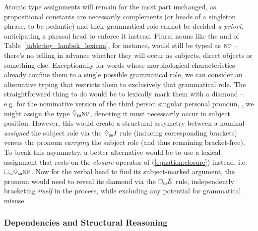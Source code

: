 Atomic type assignments will remain for the most part unchanged, as propositional constants are necessarily complements (or heads of a singleton phrase, to be pedantic) and their grammatical role cannot be decided \textit{a priori}, anticipating a phrasal head to enforce it instead.
Plural nouns like the  and  of Table~\ref{table:toy_lambek_lexicon}, for instance, would still be typed as $\np[s]$ -- there's no telling in advance whether they will occur as subjects, direct objects or something else.
Exceptionally for words whose morphological characteristics already confine them to a single possible grammatical role, we can consider an alternative typing that restricts them to exclusively that grammatical role.
The straightforward thing to do would be to lexically mark them with a diamond -- e.g. for the nominative version of the third person singular personal pronoun, , we might assign the type $\ddia{su}\np[s]$, denoting it must necessarily occur in subject position.
However, this would create a structural assymetry between a nominal \textit{assigned} the subject role via the $\ddia{su} I$ rule (inducing corresponding brackets) versus the pronoun \textit{carrying} the subject role (and thus remaining bracket-free).
To break this asymmetry, a better alternative would be to use a lexical assignment that rests on the \textit{closure} operator of (\ref{equation:closure}) instead, i.e. $\dbox{su}\ddia{su}\np[s]$.
Now for the verbal head to find its subject-marked argument, the pronoun would need to reveal its diamond via the $\dbox{su} E$ rule, independently bracketing \textit{itself} in the process, while excluding any potential for grammatical misuse.

\subsubsection{Dependencies and Structural Reasoning}
